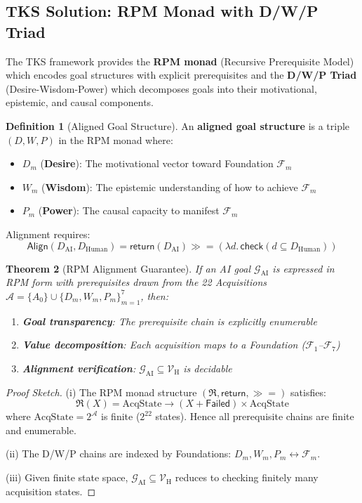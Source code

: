 \documentclass[11pt,twoside]{article}
\theoremstyle{definition}
\newtheorem{definition}{Definition}[section]
\theoremstyle{plain}
\newtheorem{theorem}[definition]{Theorem}
\theoremstyle{remark}
\newcommand{\Foundations}{\mathcal{F}}
\newcommand{\Acquisitions}{\mathcal{A}}
\newcommand{\RPM}{\mathfrak{R}}
\newcommand{\rpmret}{\mathsf{return}}
\newcommand{\rpmbind}{\mathbin{\gg\!=}}
\newcommand{\AIGoal}{\mathcal{G}_{\mathrm{AI}}}
\newcommand{\HumanValue}{\mathcal{V}_{\mathrm{H}}}
\newcommand{\AlignmentFunc}{\mathsf{Align}}
\begin{document}
\subsection{TKS Solution: RPM Monad with D/W/P Triad}

The TKS framework provides the \textbf{RPM monad} (Recursive Prerequisite Model) which
encodes goal structures with explicit prerequisites and the \textbf{D/W/P Triad}
(Desire-Wisdom-Power) which decomposes goals into their motivational, epistemic, and
causal components.

\begin{definition}[Aligned Goal Structure]
\label{def:aligned-goal}
An \textbf{aligned goal structure} is a triple $(D, W, P)$ in the RPM monad where:
\begin{itemize}
  \item $D_m$ (\textbf{Desire}): The motivational vector toward Foundation $\Foundations_m$
  \item $W_m$ (\textbf{Wisdom}): The epistemic understanding of how to achieve $\Foundations_m$
  \item $P_m$ (\textbf{Power}): The causal capacity to manifest $\Foundations_m$
\end{itemize}
Alignment requires:
\[
\AlignmentFunc(D_{\mathrm{AI}}, D_{\mathrm{Human}}) =
\rpmret(D_{\mathrm{AI}}) \rpmbind (\lambda d.\, \mathsf{check}(d \subseteq D_{\mathrm{Human}}))
\]
\end{definition}

\begin{theorem}[RPM Alignment Guarantee]
\label{thm:rpm-alignment}
If an AI goal $\AIGoal$ is expressed in RPM form with prerequisites drawn from the
22 Acquisitions $\Acquisitions = \{A_0\} \cup \{D_m, W_m, P_m\}_{m=1}^7$, then:
\begin{enumerate}
  \item \textbf{Goal transparency}: The prerequisite chain is explicitly enumerable
  \item \textbf{Value decomposition}: Each acquisition maps to a Foundation ($\Foundations_1$--$\Foundations_7$)
  \item \textbf{Alignment verification}: $\AIGoal \subseteq \HumanValue$ is decidable
\end{enumerate}
\end{theorem}

\begin{proof}[Proof Sketch]
(i) The RPM monad structure $(\RPM, \rpmret, \rpmbind)$ satisfies:
\[
\RPM(X) = \mathrm{AcqState} \to (X + \mathsf{Failed}) \times \mathrm{AcqState}
\]
where $\mathrm{AcqState} = 2^{\Acquisitions}$ is finite ($2^{22}$ states). Hence all
prerequisite chains are finite and enumerable.

(ii) The D/W/P chains are indexed by Foundations: $D_m, W_m, P_m \leftrightarrow \Foundations_m$.

(iii) Given finite state space, $\AIGoal \subseteq \HumanValue$ reduces to checking
finitely many acquisition states.
\end{proof}
\end{document}
